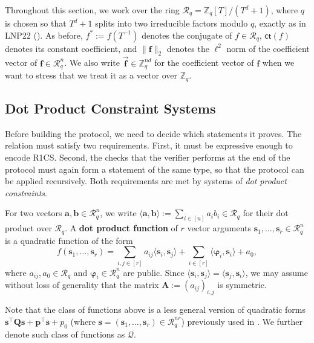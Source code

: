 \documentclass[../../book.tex]{subfiles}
\begin{document}
Throughout this section, we work over the ring $\mathcal{R}_q = \mathbb{Z}_q[T]/(T^d+1)$, where $q$ is chosen so that $T^d+1$ splits into two irreducible factors modulo $q$, exactly as in LNP22 ().
As before, $f^{\ast} := f(T^{-1})$ denotes the conjugate of $f \in \mathcal{R}_q$, $\mathsf{ct}(f)$ denotes its constant coefficient, and $\|\mathbf{f}\|_2$ denotes the $\ell^2$ norm of the coefficient vector of $\mathbf{f} \in \mathcal{R}_q^n$.
We also write $\vec{\mathbf{f}} \in \mathbb{Z}_q^{nd}$ for the coefficient vector of $\mathbf{f}$ when we want to stress that we treat it as a vector over $\mathbb{Z}_q$.

\subsection{Dot Product Constraint Systems}\label{section:labrador-relation}

Before building the protocol, we need to decide which statements it proves.
The relation must satisfy two requirements.
First, it must be expressive enough to encode R1CS.
Second, the checks that the verifier performs at the end of the protocol must again form a statement of the same type, so that the protocol can be applied recursively.
Both requirements are met by systems of \emph{dot product constraints}.

For two vectors $\mathbf{a}, \mathbf{b} \in \mathcal{R}_q^n$, we write $\langle \mathbf{a}, \mathbf{b} \rangle := \sum_{i \in [n]} a_ib_i \in \mathcal{R}_q$ for their dot product over $\mathcal{R}_q$.
A \textbf{dot product function} of $r$ vector arguments $\mathbf{s}_1, \dots, \mathbf{s}_r \in \mathcal{R}_q^n$ is a quadratic function of the form
\begin{equation*}
    f(\mathbf{s}_1, \dots, \mathbf{s}_r) = \sum_{i,j \in [r]} a_{ij}\langle \mathbf{s}_i, \mathbf{s}_j \rangle + \sum_{i \in [r]} \langle \boldsymbol{\varphi}_i, \mathbf{s}_i \rangle + a_0,
\end{equation*}
where $a_{ij}, a_0 \in \mathcal{R}_q$ and $\boldsymbol{\varphi}_i \in \mathcal{R}_q^n$ are public.
Since $\langle \mathbf{s}_i, \mathbf{s}_j \rangle = \langle \mathbf{s}_j, \mathbf{s}_i \rangle$, we may assume without loss of generality that the matrix $\mathbf{A} := (a_{ij})_{i,j}$ is symmetric.

\begin{remark}
    Note that the class of functions above is a less general version of quadratic forms $\mathbf{s}^{\top}\mathbf{Q}\mathbf{s} + \mathbf{p}^{\top}\mathbf{s} + p_0$ (where $\mathbf{s}=(\mathbf{s}_1,\dots,\mathbf{s}_r) \in \mathcal{R}_q^{nr}$) previously used in .
    We further denote such class of functions as $\mathcal{Q}$.
\end{remark}
\end{document}
